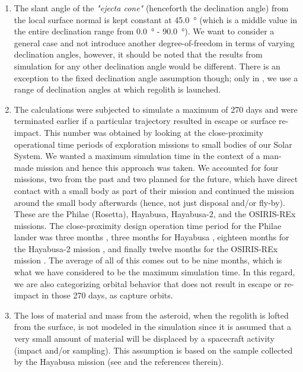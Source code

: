 \begin{enumerate}
\item The slant angle of the \textit{"ejecta cone"} (henceforth the declination angle) from the local surface normal is kept constant at \SI{45.0}{\degree} (which is a middle value in the entire declination range from \SI{0.0}{\degree} - \SI{90.0}{\degree}). We want to consider a general case and not introduce another degree-of-freedom in terms of varying declination angles, however, it should be noted that the results from simulation for any other declination angle would be different. There is an exception to the fixed declination angle assumption though; only in , we use a range of declination angles at which regolith is launched.

\item The calculations were subjected to simulate a maximum of 270 days and were terminated earlier if a particular trajectory resulted in escape or surface re-impact. This number was obtained by looking at the close-proximity operational time periods of exploration missions to small bodies of our Solar System. We wanted a maximum simulation time in the context of a man-made mission and hence this approach was taken. We accounted for four missions, two from the past and two planned for the future, which have direct contact with a small body as part of their mission and continued the mission around the small body afterwards (hence, not just disposal and/or fly-by). These are the Philae (Rosetta), Hayabusa, Hayabusa-2, and the \gls{OSIRIS-REx} missions. The close-proximity design operation time period for the Philae lander was three months \parencite{philaeMissionTimeline}, three months for Hayabusa \parencite{hayabusaCloseProximity}, eighteen months for the Hayabusa-2 mission \parencite{TsudaHayabusa2SystemDesign}, and finally twelve months for the \gls{OSIRIS-REx} mission \parencite{osirisMissionOverview}. The average of all of this comes out to be nine months, which is what we have considered to be the maximum simulation time. In this regard, we are also categorizing orbital behavior that does not result in escape or re-impact in those 270 days, as capture orbits.

\item The loss of material and mass from the asteroid, when the regolith is lofted from the surface, is not modeled in the simulation since it is assumed that a very small amount of material will be displaced by a spacecraft activity (impact and/or sampling). This assumption is based on the sample collected by the Hayabusa mission (see  and the references therein).


\end{enumerate}
